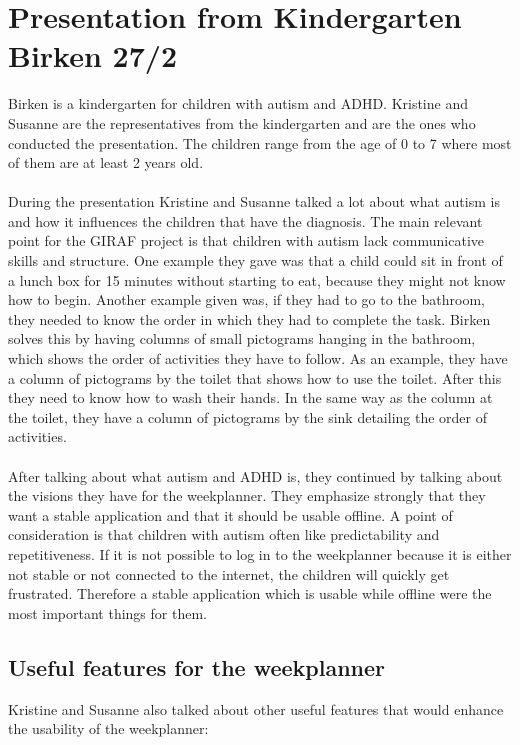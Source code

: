 \section{Presentation from Kindergarten Birken 27/2}\label{presentation-from-birken}
Birken is a kindergarten for children with autism and ADHD.
Kristine and Susanne are the representatives from the kindergarten and are the ones who conducted the presentation.
The children range from the age of 0 to 7 where most of them are at least 2 years old.
\\\\
During the presentation Kristine and Susanne talked a lot about what autism is and how it influences the children that have the diagnosis.
The main relevant point for the GIRAF project is that children with autism lack communicative skills and structure. 
One example they gave was that a child could sit in front of a lunch box for 15 minutes without starting to eat, because they might not know how to begin.
Another example given was, if they had to go to the bathroom, they needed to know the order in which they had to complete the task.
Birken solves this by having columns of small pictograms hanging in the bathroom, which shows the order of activities they have to follow. 
As an example, they have a column of pictograms by the toilet that shows how to use the toilet.
After this they need to know how to wash their hands.
In the same way as the column at the toilet, they have a column of pictograms by the sink detailing the order of activities.
\\\\
After talking about what autism and ADHD is, they continued by talking about the visions they have for the weekplanner.
They emphasize strongly that they want a stable application and that it should be usable offline.
A point of consideration is that children with autism often like predictability and repetitiveness. 
If it is not possible to log in to the weekplanner because it is either not stable or not connected to the internet, the children will quickly get frustrated.
Therefore a stable application which is usable while offline were the most important things for them.

\subsection{Useful features for the weekplanner}
Kristine and Susanne also talked about other useful features that would enhance the usability of the weekplanner:

